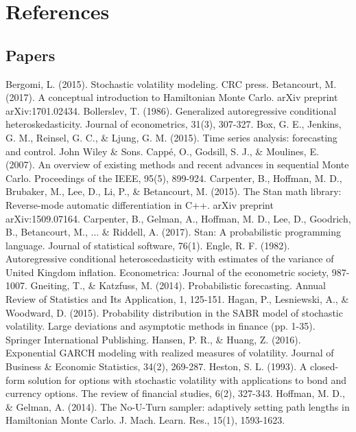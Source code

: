 \documentclass[12pt,letterpaper,reqno,fleqn]{article}
\begin{document}
\section*{References}

\subsection*{Papers}

\flushleft Bergomi, L. (2015). Stochastic volatility modeling. CRC press.
\flushleft Betancourt, M. (2017). A conceptual introduction to Hamiltonian Monte Carlo. arXiv preprint arXiv:1701.02434.
\flushleft Bollerslev, T. (1986). Generalized autoregressive conditional heteroskedasticity. Journal of econometrics, 31(3), 307-327.
\flushleft Box, G. E., Jenkins, G. M., Reinsel, G. C., \& Ljung, G. M. (2015). Time series analysis: forecasting and control. John Wiley \& Sons.
\flushleft Cappé, O., Godsill, S. J., \& Moulines, E. (2007). An overview of existing methods and recent advances in sequential Monte Carlo. Proceedings of the IEEE, 95(5), 899-924.
\flushleft Carpenter, B., Hoffman, M. D., Brubaker, M., Lee, D., Li, P., \& Betancourt, M. (2015). The Stan math library: Reverse-mode automatic differentiation in C++. arXiv preprint arXiv:1509.07164.
\flushleft Carpenter, B., Gelman, A., Hoffman, M. D., Lee, D., Goodrich, B., Betancourt, M., ... \& Riddell, A. (2017). Stan: A probabilistic programming language. Journal of statistical software, 76(1).
\flushleft Engle, R. F. (1982). Autoregressive conditional heteroscedasticity with estimates of the variance of United Kingdom inflation. Econometrica: Journal of the econometric society, 987-1007.
\flushleft Gneiting, T., \& Katzfuss, M. (2014). Probabilistic forecasting. Annual Review of Statistics and Its Application, 1, 125-151.
\flushleft Hagan, P., Lesniewski, A., \& Woodward, D. (2015). Probability distribution in the SABR model of stochastic volatility. Large deviations and asymptotic methods in finance (pp. 1-35). Springer International Publishing.
\flushleft Hansen, P. R., \& Huang, Z. (2016). Exponential GARCH modeling with realized measures of volatility. Journal of Business \& Economic Statistics, 34(2), 269-287.
\flushleft Heston, S. L. (1993). A closed-form solution for options with stochastic volatility with applications to bond and currency options. The review of financial studies, 6(2), 327-343.
\flushleft Hoffman, M. D., \& Gelman, A. (2014). The No-U-Turn sampler: adaptively setting path lengths in Hamiltonian Monte Carlo. J. Mach. Learn. Res., 15(1), 1593-1623.
\end{document}
